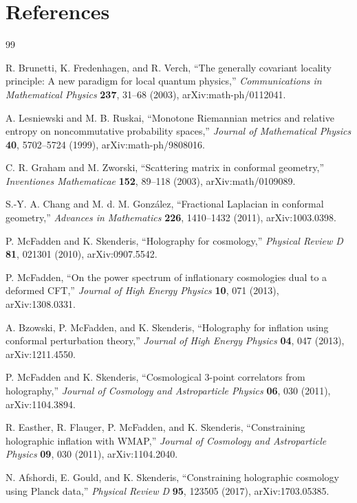 \documentclass[11pt]{article}
\numberwithin{equation}{section}
\theoremstyle{definition}
\theoremstyle{remark}
\begin{document}
\section{References}
\begin{thebibliography}{99}

R. Brunetti, K. Fredenhagen, and R. Verch,
``The generally covariant locality principle: A new paradigm for local quantum physics,''
\emph{Communications in Mathematical Physics} \textbf{237}, 31--68 (2003),
arXiv:math-ph/0112041.

A. Lesniewski and M. B. Ruskai,
``Monotone Riemannian metrics and relative entropy on noncommutative probability spaces,''
\emph{Journal of Mathematical Physics} \textbf{40}, 5702--5724 (1999),
arXiv:math-ph/9808016.

C. R. Graham and M. Zworski,
``Scattering matrix in conformal geometry,''
\emph{Inventiones Mathematicae} \textbf{152}, 89--118 (2003),
arXiv:math/0109089.

S.-Y. A. Chang and M. d. M. Gonz\'alez,
``Fractional Laplacian in conformal geometry,''
\emph{Advances in Mathematics} \textbf{226}, 1410--1432 (2011),
arXiv:1003.0398.

P. McFadden and K. Skenderis,
``Holography for cosmology,''
\emph{Physical Review D} \textbf{81}, 021301 (2010),
arXiv:0907.5542.

P. McFadden,
``On the power spectrum of inflationary cosmologies dual to a deformed CFT,''
\emph{Journal of High Energy Physics} \textbf{10}, 071 (2013),
arXiv:1308.0331.

A. Bzowski, P. McFadden, and K. Skenderis,
``Holography for inflation using conformal perturbation theory,''
\emph{Journal of High Energy Physics} \textbf{04}, 047 (2013),
arXiv:1211.4550.

P. McFadden and K. Skenderis,
``Cosmological 3-point correlators from holography,''
\emph{Journal of Cosmology and Astroparticle Physics} \textbf{06}, 030 (2011),
arXiv:1104.3894.

R. Easther, R. Flauger, P. McFadden, and K. Skenderis,
``Constraining holographic inflation with WMAP,''
\emph{Journal of Cosmology and Astroparticle Physics} \textbf{09}, 030 (2011),
arXiv:1104.2040.

N. Afshordi, E. Gould, and K. Skenderis,
``Constraining holographic cosmology using Planck data,''
\emph{Physical Review D} \textbf{95}, 123505 (2017),
arXiv:1703.05385.


\end{thebibliography}
\end{document}
